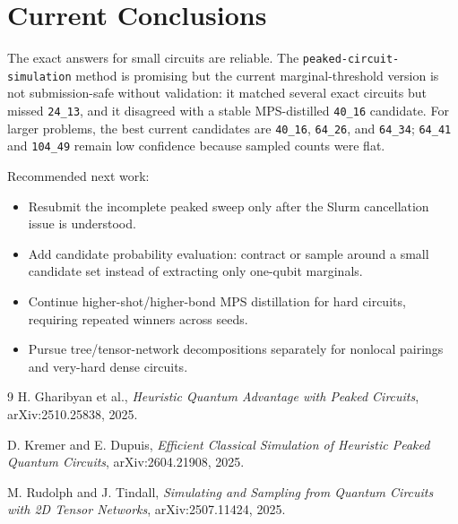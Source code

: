 \documentclass[10pt]{article}
\newcommand{\code}[1]{\texttt{#1}}
\begin{document}


\section{Current Conclusions}
The exact answers for small circuits are reliable.  The \code{peaked-circuit-simulation} method is promising but the current marginal-threshold version is not submission-safe without validation: it matched several exact circuits but missed \code{24\_13}, and it disagreed with a stable MPS-distilled \code{40\_16} candidate.  For larger problems, the best current candidates are \code{40\_16}, \code{64\_26}, and \code{64\_34}; \code{64\_41} and \code{104\_49} remain low confidence because sampled counts were flat.

Recommended next work:
\begin{itemize}
  \item Resubmit the incomplete peaked sweep only after the Slurm cancellation issue is understood.
  \item Add candidate probability evaluation: contract or sample around a small candidate set instead of extracting only one-qubit marginals.
  \item Continue higher-shot/higher-bond MPS distillation for hard circuits, requiring repeated winners across seeds.
  \item Pursue tree/tensor-network decompositions separately for nonlocal pairings and very-hard dense circuits.
\end{itemize}

\begin{thebibliography}{9}
H. Gharibyan et al.,
\emph{Heuristic Quantum Advantage with Peaked Circuits}, arXiv:2510.25838, 2025.

D. Kremer and E. Dupuis,
\emph{Efficient Classical Simulation of Heuristic Peaked Quantum Circuits}, arXiv:2604.21908, 2025.

M. Rudolph and J. Tindall,
\emph{Simulating and Sampling from Quantum Circuits with 2D Tensor Networks}, arXiv:2507.11424, 2025.
\end{thebibliography}


\end{document}
